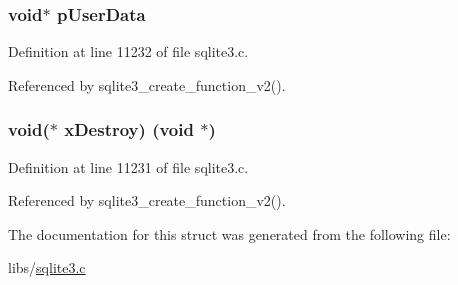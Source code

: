 \subsubsection[{p\+User\+Data}]{\setlength{\rightskip}{0pt plus 5cm}void$\ast$ p\+User\+Data}\label{struct_func_destructor_a8d75dbe9027a94780bc2f31670400613}


Definition at line 11232 of file sqlite3.\+c.



Referenced by sqlite3\+\_\+create\+\_\+function\+\_\+v2().

\hypertarget{struct_func_destructor_aa4fca9e7c2c7eaf8fc25b50e9a7c1329}{}
\subsubsection[{x\+Destroy}]{\setlength{\rightskip}{0pt plus 5cm}void($\ast$ x\+Destroy) (void $\ast$)}\label{struct_func_destructor_aa4fca9e7c2c7eaf8fc25b50e9a7c1329}


Definition at line 11231 of file sqlite3.\+c.



Referenced by sqlite3\+\_\+create\+\_\+function\+\_\+v2().



The documentation for this struct was generated from the following file\+:\begin{DoxyCompactItemize}
\item 
libs/\hyperlink{sqlite3_8c}{sqlite3.\+c}\end{DoxyCompactItemize}
